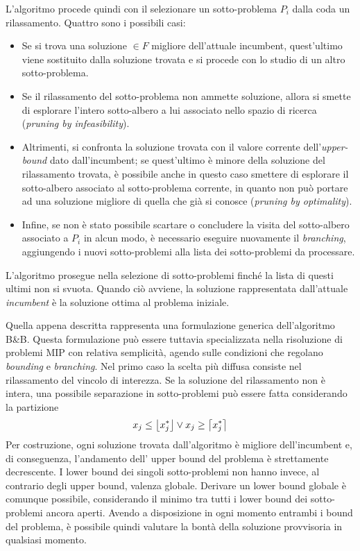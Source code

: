 L'algoritmo procede quindi con il selezionare un sotto-problema $P_i$ dalla coda un rilassamento. Quattro sono i possibili casi:
\begin{itemize}
\itemsep-0.5em 
\item Se si trova una soluzione $\in F$ migliore dell'attuale incumbent, quest'ultimo viene 
sostituito dalla soluzione trovata e si procede con lo studio di un altro sotto-problema.
\item Se il rilassamento del sotto-problema non ammette soluzione, allora si smette di esplorare l'intero sotto-albero a lui associato 
nello spazio di ricerca (\textit{pruning by infeasibility}).
\item Altrimenti, si confronta la soluzione trovata con il valore corrente dell'\textit{upper-bound} dato dall'incumbent; se
quest'ultimo è minore
della soluzione del rilassamento trovata, è possibile anche in questo caso smettere di esplorare il sotto-albero associato al
sotto-problema corrente,
in quanto non può portare ad una soluzione migliore di quella che già si conosce (\textit{pruning by optimality}).
\item Infine, se non è stato possibile scartare o concludere la visita del sotto-albero associato a $P_i$ in alcun modo, è necessario
eseguire nuovamente il \textit{branching}, aggiungendo i nuovi sotto-problemi alla lista dei sotto-problemi da processare.
\end{itemize}
L'algoritmo prosegue nella selezione di sotto-problemi finché la lista di questi ultimi non si svuota. Quando ciò avviene, la soluzione
rappresentata dall'attuale \textit{incumbent} è la soluzione ottima al problema iniziale.

Quella appena descritta rappresenta una formulazione generica dell'algoritmo B\&B. Questa formulazione può essere
tuttavia specializzata nella risoluzione di problemi MIP con relativa semplicità, agendo sulle condizioni che regolano 
\textit{bounding} e \textit{branching}. Nel primo caso la scelta più diffusa consiste nel rilassamento del vincolo di interezza.
Se la soluzione del rilassamento non è intera, una possibile separazione in sotto-problemi può essere fatta considerando la partizione
\begin{align*}
x_j \leq \floor*{x_j^*} \vee x_j \geq \ceil*{x_j^*}
\end{align*}
Per costruzione, ogni soluzione trovata dall'algoritmo è migliore dell'incumbent e, di conseguenza, l'andamento dell'
upper bound del problema è strettamente decrescente. I lower bound dei singoli sotto-problemi non hanno invece, al contrario degli 
upper bound, valenza globale. Derivare un lower bound globale è comunque possibile, considerando il minimo tra tutti
i lower bound dei sotto-problemi ancora aperti. Avendo a disposizione in ogni momento entrambi i bound del problema, 
è possibile quindi valutare la bontà della soluzione provvisoria in qualsiasi momento. 


